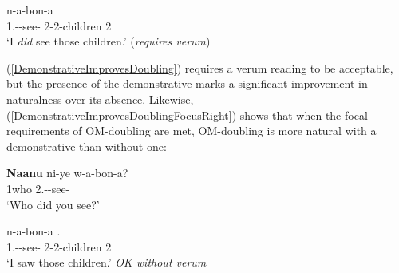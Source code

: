 \documentclass[output=paper]{langscibook}
\begin{document}
\begin{exe}
\ex \label{DemonstrativeImprovesDoubling}


\gll n-a-bon-a  \\
1\Sg{}.\Sm-\Om-see-\Fv{} {2-2-children 2\Dem{}} \\
\glt `I \textit{did} see those children.'  (\textit{requires verum})
\end{exe}

(\ref{DemonstrativeImprovesDoubling}) requires a verum reading to be acceptable, but the presence of the demonstrative marks a significant improvement in naturalness over its absence.  Likewise, (\ref{DemonstrativeImprovesDoublingFocusRight}) shows that when the focal requirements of OM-doubling are met, OM-doubling is more natural with a demonstrative than without one: 


\ea \label{DemonstrativeImprovesDoublingFocusRight}
\begin{xlist}

\gll \textbf{Naanu} ni-ye w-a-bon-a? \\
1who  2\Sg.\Sm-\Pst-see-\Fv{} \\
\glt `Who did you see?'

 \label{DoubleMonotransitiveFocusedObject}
\gll n-a-bon-a . \\
1\Sg.\Sm-\Om-see-\Fv{} {2-2-children 2\Dem{}} \\
\glt `I saw those children.' \textit{OK without verum}

\end{xlist}
\z 



\end{document}
